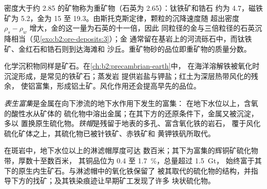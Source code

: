 密度大于约 2.85 的矿物称为重矿物（石英为 2.65）：钛铁矿和锆石
约为 4.7，磁铁矿为 5.2，金为 15 至 19.3。由斯托克斯定律，颗粒的沉降速度随
超出密度 $\rho_s - \rho_w$ 增大，金的这一量为石英的十一倍，因此
同粒径的金与三倍粒径的石英沉降相当（见\cref{exo:b2:ore-deposits:3}）；金
通常留在基岩上的河流砾石中，而钛铁矿、金红石和锆石则到达海滩和
沙丘。重矿物砂的品位即重矿物的质量分数。

化学沉积物同样是矿石。在\cref{ch:b2:precambrian-earth}中，
在海洋溶解铁被氧化时沉淀形成，是常见的铁矿石；蒸发岩
提供岩盐与钾盐；红土为深层热带风化的残余，
使铝富集，形成铝土矿。风化作用还会提高早先的品位。

\begin{definition}[表生富集，铁帽]\label{def:b2:ore-deposits:supergene}
\emph{表生富集}是金属在向下渗流的地下水作用下发生的富集：
在地下水位以上，含氧的酸性水从矿体的
硫化物中溶出金属；在其下方的还原条件下，金属又被沉淀，多以
置换原生硫化物。\emph{铁帽}是残留于地表的多孔、富含氧化铁的岩石，
覆于风化硫化矿体之上，其硫化物已被针铁矿、赤铁矿和
黄钾铁矾所取代。
\end{definition}

在斑岩中，地下水位以上的淋滤帽厚度可达
数百米；其下为富集的辉铜矿硫化物带，厚数十至数百米，
其铜品位为 0.4 至 \qty{1.7}{\percent}，总量超过 \qty{1.5}{Gt}，
始终富于其下的原生内生矿石。与淋滤帽中的氧化铁保留了
被其取代的硫化物的结构，并指导下方的找矿；及其铁染痕迹让早期矿工发现了许多
块状硫化物。

